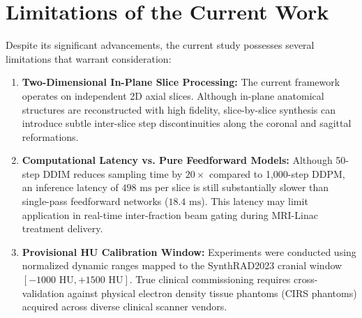 \section{Limitations of the Current Work}
Despite its significant advancements, the current study possesses several limitations that warrant consideration:
\begin{enumerate}
    \item \textbf{Two-Dimensional In-Plane Slice Processing:} The current framework operates on independent 2D axial slices. Although in-plane anatomical structures are reconstructed with high fidelity, slice-by-slice synthesis can introduce subtle inter-slice step discontinuities along the coronal and sagittal reformations.
    \item \textbf{Computational Latency vs. Pure Feedforward Models:} Although 50-step DDIM reduces sampling time by $20\times$ compared to 1,000-step DDPM, an inference latency of $498\text{ ms}$ per slice is still substantially slower than single-pass feedforward networks ($18.4\text{ ms}$). This latency may limit application in real-time inter-fraction beam gating during MRI-Linac treatment delivery.
    \item \textbf{Provisional HU Calibration Window:} Experiments were conducted using normalized dynamic ranges mapped to the SynthRAD2023 cranial window $[-1000\text{ HU}, +1500\text{ HU}]$. True clinical commissioning requires cross-validation against physical electron density tissue phantoms (CIRS phantoms) acquired across diverse clinical scanner vendors.
\end{enumerate}

